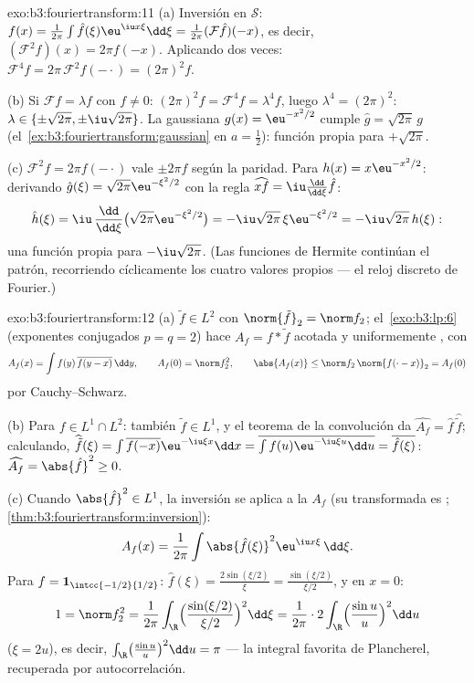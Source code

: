 \begin{solution}{exo:b3:fouriertransform:11}
(a) Inversión en $\mathcal S$: $f(x) =
\frac1{2\pi}\int\hat f(\xi)\eu^{\iu x\xi}\dd\xi =
\frac1{2\pi}(\mathcal F\hat f)(-x)$, es decir, $(\mathcal
F^2f)(x) = 2\pi f(-x)$. Aplicando dos veces: $\mathcal F^4f =
2\pi\,\mathcal F^2f(-\cdot) = (2\pi)^2f$.

(b) Si $\mathcal Ff = \lambda f$ con $f \neq 0$:
$(2\pi)^2f = \mathcal F^4f = \lambda^4f$, luego $\lambda^4 =
(2\pi)^2$: $\lambda \in \{\pm\sqrt{2\pi},
\pm\iu\sqrt{2\pi}\}$. La gaussiana $g(x) = \eu^{-x^2/2}$ cumple
$\hat g = \sqrt{2\pi}\,g$
(el~\cref{ex:b3:fouriertransform:gaussian} en $a = \frac12$): función
propia para $+\sqrt{2\pi}$.

(c) $\mathcal F^2f = 2\pi f(-\cdot)$ vale $\pm2\pi f$ según la paridad.
Para $h(x) = x\eu^{-x^2/2}$: derivando
$\hat g(\xi) = \sqrt{2\pi}\eu^{-\xi^2/2}$ con la regla
$\widehat{xf} = \iu\frac{\dd}{\dd\xi}\hat f$:
\[
\hat h(\xi) = \iu\,\frac{\dd}{\dd\xi}\bigl(\sqrt{2\pi}
\eu^{-\xi^2/2}\bigr) = -\iu\sqrt{2\pi}\,\xi\eu^{-\xi^2/2}
= -\iu\sqrt{2\pi}\,h(\xi) :
\]
una función propia para $-\iu\sqrt{2\pi}$. (Las funciones de Hermite
continúan el patrón, recorriendo cíclicamente los cuatro valores propios
--- el reloj discreto de Fourier.)

\end{solution}

\begin{solution}{exo:b3:fouriertransform:12}
(a) $\tilde f \in L^2$ con $\norm{\tilde f}_2 = \norm f_2$;
el~\cref{exo:b3:lp:6} (exponentes conjugados $p = q = 2$) hace
$A_f = f * \tilde f$ acotada y uniformemente
, con
\[
A_f(x) = \int f(y)\,\overline{f(y - x)}\,\dd y,
\qquad A_f(0) = \norm f_2^2,
\qquad \abs{A_f(x)} \leq \norm f_2\,\norm{f(\cdot -
x)}_2 = A_f(0)
\]
por Cauchy--Schwarz.

(b) Para $f \in L^1\cap L^2$: también $\tilde f \in L^1$, y el teorema
de la convolución da $\widehat{A_f} = \hat f\,
\widehat{\tilde f}$; calculando, $\widehat{\tilde f}(\xi) =
\int\overline{f(-x)}\eu^{-\iu\xi x}\dd x =
\overline{\int f(u)\eu^{-\iu\xi u}\dd u} =
\overline{\hat f(\xi)}$: $\widehat{A_f} = \abs{\hat f}^2
\geq 0$.

(c) Cuando $\abs{\hat f}^2 \in L^1$, la inversión se aplica a la
 $A_f$ (su transformada es
;
\cref{thm:b3:fouriertransform:inversion}):
\[
A_f(x) = \frac1{2\pi}\int\abs{\hat f(\xi)}^2
\eu^{\iu x\xi}\,\dd\xi .
\]
Para $f = \mathbf 1_{\intcc{-1/2}{1/2}}$: $\hat f(\xi) =
\frac{2\sin(\xi/2)}\xi = \frac{\sin(\xi/2)}{\xi/2}$, y en
$x = 0$:
\[
1 = \norm f_2^2 = \frac1{2\pi}\int_\R
\Bigl(\frac{\sin(\xi/2)}{\xi/2}\Bigr)^2\dd\xi
= \frac1{2\pi}\cdot2\int_\R\Bigl(\frac{\sin u}u\Bigr)^2\dd u
\]
($\xi = 2u$), es decir, $\int_\R\bigl(\frac{\sin u}u\bigr)^2\dd
u = \pi$ --- la integral favorita de Plancherel, recuperada por
autocorrelación.
\end{solution}

